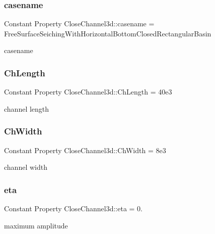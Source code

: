 \subsubsection{\texorpdfstring{casename}{casename}}
{\footnotesize\ttfamily Constant Property Close\+Channel3d\+::casename = \textquotesingle{}Free\+Surface\+Seiching\+With\+Horizontal\+Bottom\+Closed\+Rectangular\+Basin\textquotesingle{}}



casename 

\mbox{\label{class_close_channel3d_af505aaf5eda97ab3532f97b1e869d8fc}} 
\subsubsection{\texorpdfstring{Ch\+Length}{ChLength}}
{\footnotesize\ttfamily Constant Property Close\+Channel3d\+::\+Ch\+Length = 40e3}



channel length 

\mbox{\label{class_close_channel3d_a5124ed070a0e6543848ac61ccf9f1cc4}} 
\subsubsection{\texorpdfstring{Ch\+Width}{ChWidth}}
{\footnotesize\ttfamily Constant Property Close\+Channel3d\+::\+Ch\+Width = 8e3}



channel width 

\mbox{\label{class_close_channel3d_a8b9d0e617bf199b99c5e24e3cdeeee89}} 
\subsubsection{\texorpdfstring{eta}{eta}}
{\footnotesize\ttfamily Constant Property Close\+Channel3d\+::eta = 0.}



maximum amplitude 

